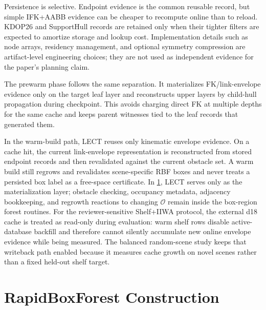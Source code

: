 \documentclass[journal]{IEEEtran}
\DeclareRobustCommand{\textsc}[1]{\textnormal{\MakeUppercase{#1}}}
\newcommand{\rbf}{\textsc{RBF}}
\begin{document}
Persistence is selective. Endpoint evidence is the common reusable record, but
simple IFK+AABB evidence can be cheaper to recompute online than to reload.
KDOP26 and SupportHull records are retained only when their tighter filters are
expected to amortize storage and lookup cost. Implementation details such as
node arrays, residency management, and optional symmetry compression are
artifact-level engineering choices; they are not used as independent evidence
for the paper's planning claim.

The prewarm phase follows the same separation. It materializes FK/link-envelope
evidence only on the target leaf layer and reconstructs upper layers by
child-hull propagation during checkpoint. This avoids charging direct FK at
multiple depths for the same cache and keeps parent witnesses tied to the leaf
records that generated them.

In the warm-build path, LECT reuses only kinematic envelope evidence. On a cache
hit, the current link-envelope representation is reconstructed from stored
endpoint records and then revalidated against the current obstacle set. A warm
build still regrows and revalidates scene-specific \rbf{} boxes and never treats
a persisted box label as a free-space certificate. In \cref{sec:forest}, LECT
serves only as the materialization layer; obstacle checking, occupancy metadata,
adjacency bookkeeping, and regrowth reactions to changing $\mathcal{O}$ remain
inside the box-region forest routines. For the reviewer-sensitive Shelf+IIWA
protocol, the external d18 cache is treated as read-only during evaluation:
warm shelf rows disable active-database backfill and therefore cannot silently
accumulate new online envelope evidence while being measured. The balanced
random-scene study keeps that writeback path enabled because it measures cache
growth on novel scenes rather than a fixed held-out shelf target.

\section{RapidBoxForest Construction}\label{sec:forest}
\end{document}
